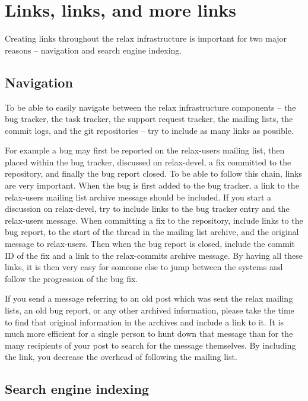 
\section{Links, links, and more links}

Creating links throughout the relax infrastructure is important for two major reasons -- navigation and search engine indexing.


\subsection{Navigation}

To be able to easily navigate between the relax infrastructure components -- the bug tracker, the task tracker, the support request tracker, the mailing lists, the commit logs, and the git repositories -- try to include as many links as possible.

For example a bug may first be reported on the relax-users mailing list, then placed within the bug tracker, discussed on relax-devel, a fix committed to the repository, and finally the bug report closed.
To be able to follow this chain, links are very important.
When the bug is first added to the bug tracker, a link to the relax-users mailing list archive message should be included.
If you start a discussion on relax-devel, try to include links to the bug tracker entry and the relax-users message.
When committing a fix to the repository, include links to the bug report, to the start of the thread in the mailing list archive, and the original message to relax-users.
Then when the bug report is closed, include the commit ID of the fix and a link to the relax-commits archive message.
By having all these links, it is then very easy for someone else to jump between the systems and follow the progression of the bug fix.

If you send a message referring to an old post which was sent the relax mailing lists, an old bug report, or any other archived information, please take the time to find that original information in the archives and include a link to it.
It is much more efficient for a single person to hunt down that message than for the many recipients of your post to search for the message themselves.
By including the link, you decrease the overhead of following the mailing list.


\subsection{Search engine indexing}

